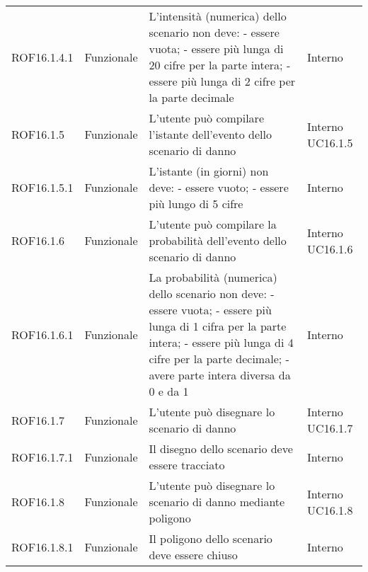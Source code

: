 \begin{longtable}{p{2cm}!{\VRule[1pt]}p{2cm}!{\VRule[1pt]}p{5cm}!{\VRule[1pt]}p{1.5cm}}
	\\
	ROF16.1.4.1&Funzionale\newline  & L'intensità (numerica) dello scenario non deve:
	- essere vuota;
	- essere più lunga di 20 cifre per la
	parte intera; 
	- essere più lunga di 2 cifre per la parte decimale & Interno \\
	ROF16.1.5                        & Funzionale\newline               & L'utente può compilare l'istante dell'evento dello scenario di danno                                                     & Interno \newline UC16.1.5    
	\\
	ROF16.1.5.1&Funzionale\newline  & L'istante (in giorni) non deve:
	- essere vuoto;
	- essere più lungo di 5 cifre & Interno \\
	ROF16.1.6                        & Funzionale\newline               & L'utente può compilare la probabilità  dell'evento dello scenario di danno                                              & Interno \newline UC16.1.6    
	\\
	ROF16.1.6.1&Funzionale\newline  & La probabilità (numerica) dello scenario non deve:
	- essere vuota;
	- essere più lunga di 1 cifra per la parte intera; 
	- essere più lunga di 4 cifre per la parte decimale;
	- avere parte intera diversa da 0 e da 1 & Interno \\
	ROF16.1.7                        & Funzionale\newline               & L'utente può disegnare lo scenario di danno                                                                              & Interno \newline UC16.1.7    
	\\
	ROF16.1.7.1                      & Funzionale\newline               & Il disegno dello scenario deve essere tracciato                                                                           & Interno                      \\
	ROF16.1.8                        & Funzionale\newline               & L'utente può disegnare lo scenario di danno mediante poligono                                                            & Interno \newline UC16.1.8    
	\\
	ROF16.1.8.1                      & Funzionale\newline               & Il poligono dello scenario deve essere chiuso                                                                             & Interno                      \\

\end{longtable}

